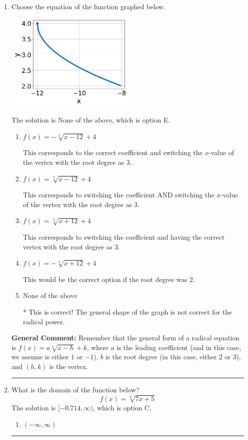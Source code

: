 \documentclass{extbook}[14pt]
\newcommand{\litem}[1]{\item #1

\rule{\textwidth}{0.4pt}}
\begin{document}
\begin{enumerate}\litem{
Choose the equation of the function graphed below.

\begin{center}
    \includegraphics[width=0.5\textwidth]{../Figures/radicalGraphToEquationC.png}
\end{center}


The solution is \( \text{None of the above} \), which is option E.\begin{enumerate}[label=\Alph*.]
\item \( f(x) = - \sqrt[3]{x - 12} + 4 \)

This corresponds to the correct coefficient and switching the $x$-value of the vertex with the root degree as $3$.
\item \( f(x) = \sqrt[3]{x - 12} + 4 \)

This corresponds to switching the coefficient AND switching the $x$-value of the vertex with the root degree as $3$.
\item \( f(x) = \sqrt[3]{x + 12} + 4 \)

This corresponds to switching the coefficient and having the correct vertex with the root degree as $3$.
\item \( f(x) = - \sqrt[3]{x + 12} + 4 \)

This would be the correct option if the root degree was $2$.
\item \( \text{None of the above} \)

* This is correct! The general shape of the graph is not correct for the radical power.
\end{enumerate}

\textbf{General Comment:} Remember that the general form of a radical equation is $ f(x) = a \sqrt[b]{x - h} + k$, where $a$ is the leading coefficient (and in this case, we assume is either $1$ or $-1$), $b$ is the root degree (in this case, either $2$ or $3$), and $(h, k)$ is the vertex.
}
\litem{
What is the domain of the function below?
\[ f(x) = \sqrt[8]{7 x + 5} \]The solution is \( [-0.714, \infty) \), which is option C.\begin{enumerate}[label=\Alph*.]
\item \( (-\infty, \infty) \)


\end{enumerate}}
\end{enumerate}
\end{document}
